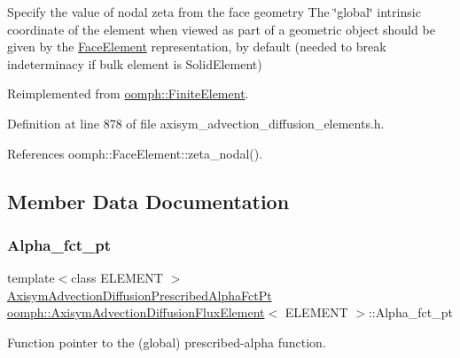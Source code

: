 Specify the value of nodal zeta from the face geometry The \char`\"{}global\char`\"{} intrinsic coordinate of the element when viewed as part of a geometric object should be given by the \hyperlink{classoomph_1_1FaceElement}{Face\+Element} representation, by default (needed to break indeterminacy if bulk element is Solid\+Element) 



Reimplemented from \hyperlink{classoomph_1_1FiniteElement_a849561c5fbcbc07dc49d2dc6cca68559}{oomph\+::\+Finite\+Element}.



Definition at line 878 of file axisym\+\_\+advection\+\_\+diffusion\+\_\+elements.\+h.



References oomph\+::\+Face\+Element\+::zeta\+\_\+nodal().



\subsection{Member Data Documentation}
\mbox{\label{classoomph_1_1AxisymAdvectionDiffusionFluxElement_a5e700f50fff5fcdcf9701afe3719ab12}} 
\subsubsection{\texorpdfstring{Alpha\+\_\+fct\+\_\+pt}{Alpha\_fct\_pt}}
{\footnotesize\ttfamily template$<$class E\+L\+E\+M\+E\+NT $>$ \\
\hyperlink{classoomph_1_1AxisymAdvectionDiffusionFluxElement_aa0922f19043ccc259c61c704fa3b5767}{Axisym\+Advection\+Diffusion\+Prescribed\+Alpha\+Fct\+Pt} \hyperlink{classoomph_1_1AxisymAdvectionDiffusionFluxElement}{oomph\+::\+Axisym\+Advection\+Diffusion\+Flux\+Element}$<$ E\+L\+E\+M\+E\+NT $>$\+::Alpha\+\_\+fct\+\_\+pt\hspace{0.3cm}{\ttfamily [private]}}



Function pointer to the (global) prescribed-\/alpha function. 



